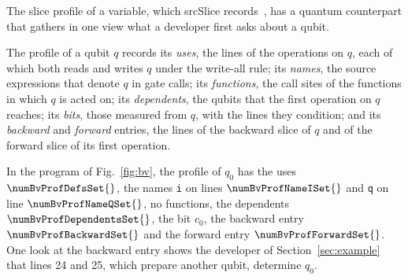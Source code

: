 The slice profile of a variable, which srcSlice records~\cite{alomari2014srcslice}, has a quantum counterpart that
gathers in one view what a developer first asks about a qubit.

\begin{definition}\label{def:profile}
The profile of a qubit $q$ records its \emph{uses}, the lines of the operations on $q$, each of which both reads
and writes $q$ under the write-all rule; its \emph{names}, the source expressions that denote $q$ in gate calls; its
\emph{functions}, the call sites of the functions in which $q$ is acted on; its \emph{dependents}, the qubits that the
first operation on $q$ reaches; its \emph{bits}, those measured from $q$, with the lines they condition; and its
\emph{backward} and \emph{forward} entries, the lines of the backward slice of $q$ and of the forward slice of its
first operation.
\end{definition}

In the program of Fig.~\ref{fig:bv}, the profile of $q_0$ has the uses $\numBvProfDefsSet{}$, the names \texttt{i} on
lines $\numBvProfNameISet{}$ and \texttt{q} on line $\numBvProfNameQSet{}$, no functions, the dependents
$\numBvProfDependentsSet{}$, the bit $c_0$, the backward entry $\numBvProfBackwardSet{}$ and the forward entry
$\numBvProfForwardSet{}$. One look at the backward entry shows the developer of Section~\ref{sec:example} that lines 24
and 25, which prepare another qubit, determine $q_0$.
